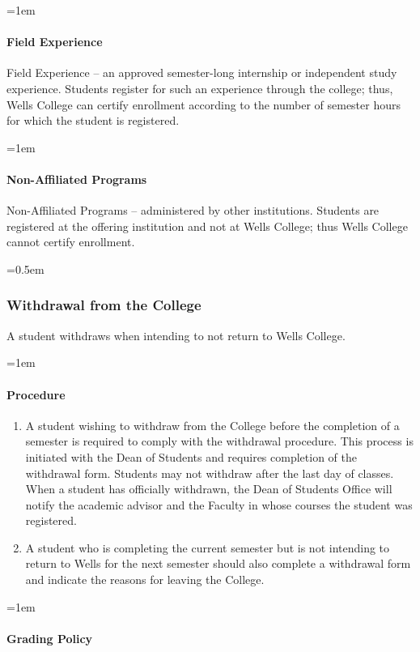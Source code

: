\documentclass{manual}
\let\oldsubsubsection\subsubsection
\renewcommand\subsubsection{\leftskip=0.5em\oldsubsubsection}
\let\oldparagraph\paragraph
\renewcommand\paragraph{\leftskip=1em\oldparagraph}
\begin{document}
\paragraph{Field Experience}
Field Experience -- an approved semester-long internship or independent study experience. Students register for such an experience through the college; thus, Wells College can certify enrollment according to the number of semester hours for which the student is registered.

\paragraph{Non-Affiliated Programs}
Non-Affiliated Programs -- administered by other institutions. Students are registered at the offering institution and not at Wells College; thus Wells College cannot certify enrollment.

\subsubsection{Withdrawal from the College}\label{sub:WithdrawlFromTheCollege}

A student withdraws when intending to not return to Wells College.

\paragraph{Procedure}
\begin{enumerate}[label=\alph*)]
\item A student wishing to withdraw from the College before the completion of a semester is required to comply with the withdrawal procedure. This process is initiated with the Dean of Students and requires completion of the withdrawal form. Students may not withdraw after the last day of classes. When a student has officially withdrawn, the Dean of Students Office will notify the academic advisor and the Faculty in whose courses the student was registered.

\item A student who is completing the current semester but is not intending to return to Wells for the next semester should also complete a withdrawal form and indicate the reasons for leaving the College.
\end{enumerate}
\paragraph{Grading Policy}
\end{document}
